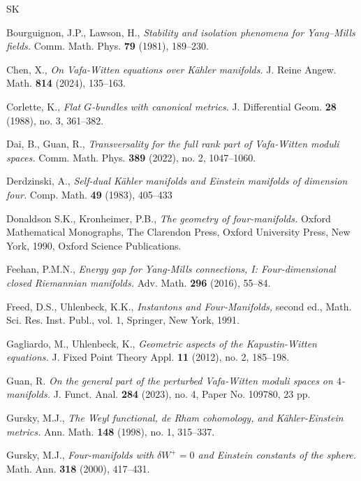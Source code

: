 \documentclass[12pt, twoside]{article}
\theoremstyle{definition}
\numberwithin{equation}{section}
\def \de {\delta}
\begin{document}
\bigskip
\footnotesize
\begin{thebibliography}{SK}
	
Bourguignon, J.P., Lawson, H.,
\textit{Stability and isolation phenomena for Yang–Mills fields.}
Comm. Math. Phys. \textbf{79} (1981), 189--230. 
	
Chen, X.,
\textit{On Vafa-Witten equations over Kähler manifolds.}
J. Reine Angew. Math. \textbf{814} (2024), 135--163. 

Corlette, K.,
\textit{Flat $G$-bundles with canonical metrics.}
J. Differential Geom. \textbf{28} (1988), no. 3, 361--382.

Dai, B., Guan, R.,
\textit{Transversality for the full rank part of Vafa-Witten moduli spaces.} Comm. Math. Phys. \textbf{389} (2022), no. 2, 1047--1060.

Derdzinski, A.,
\textit{Self-dual K\"{a}hler manifolds and Einstein manifolds of dimension four.}
Comp. Math. \textbf{49} (1983), 405--433


Donaldson S.K., Kronheimer, P.B.,
\textit{The geometry of four-manifolds.} Oxford Mathematical Monographs, The Clarendon Press, Oxford University Press, New York, 1990, Oxford Science Publications. 

Feehan, P.M.N.,
\textit{Energy gap for Yang-Mills connections, I: Four-dimensional closed Riemannian manifolds.}
Adv. Math. \textbf{296} (2016), 55--84.

 
Freed, D.S., Uhlenbeck, K.K.,
\textit{Instantons and Four-Manifolds,} second ed., Math. Sci. Res. Inst. Publ., vol. 1, Springer, New York, 1991.

Gagliardo, M., Uhlenbeck, K.,
\textit{Geometric aspects of the Kapustin-Witten equations.}
J. Fixed Point Theory Appl. \textbf{11} (2012), no. 2, 185--198. 

Guan, R.
\textit{On the general part of the perturbed Vafa-Witten moduli spaces on $4$-manifolds.} 
J. Funct. Anal. \textbf{284} (2023), no. 4, Paper No. 109780, 23 pp.


Gursky, M.J.,
\textit{The Weyl functional, de Rham cohomology, and K\"{a}hler-Einstein metrics.} Ann. Math. \textbf{148} (1998), no. 1, 315--337.

Gursky, M.J.,
\textit{Four-manifolds with $\de W^{+}=0$ and Einstein constants of the sphere.}
Math. Ann. \textbf{318} (2000), 417--431.


\end{thebibliography}
\end{document}
